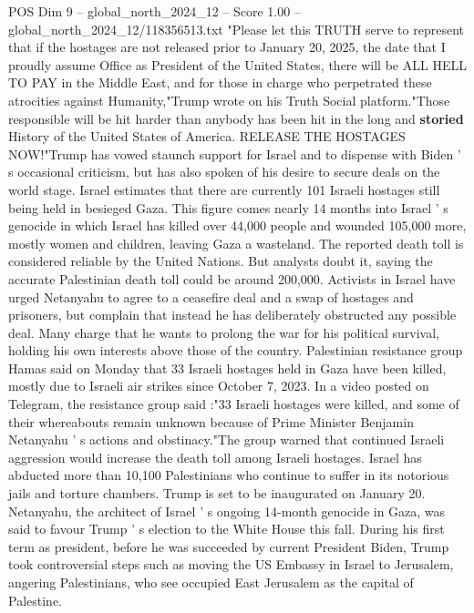 \begin{textsample}{POS Dim 9 – global\_north\_2024\_12 – Score 1.00 – global\_north\_2024\_12/118356513.txt}  \label{ex:f9_pos_336}
"Please let this TRUTH serve to represent that if the hostages are not released prior to January 20, 2025, the date that I proudly assume Office as President of the United States, there will be ALL HELL TO PAY in the Middle East, and for those in charge who perpetrated these atrocities against Humanity,"Trump wrote on his Truth Social platform."Those responsible will be hit harder than anybody has been hit in the long and \textbf{storied} History of the United States of America.
RELEASE THE HOSTAGES NOW!"Trump has vowed staunch support for Israel and to dispense with Biden ' s occasional criticism, but has also spoken of his desire to secure deals on the world stage.
Israel estimates that there are currently 101 Israeli hostages still being held in besieged Gaza.
This figure comes nearly 14 months into Israel ' s genocide in which Israel has killed over 44,000 people and wounded 105,000 more, mostly women and children, leaving Gaza a wasteland.
The reported death toll is considered reliable by the United Nations.
But analysts doubt it, saying the accurate Palestinian death toll could be around 200,000.
Activists in Israel have urged Netanyahu to agree to a ceasefire deal and a swap of hostages and prisoners, but complain that instead he has deliberately obstructed any possible deal.
Many charge that he wants to prolong the war for his political survival, holding his own interests above those of the country.
Palestinian resistance group Hamas said on Monday that 33 Israeli hostages held in Gaza have been killed, mostly due to Israeli air strikes since October 7, 2023.
In a video posted on Telegram, the resistance group said :"33 Israeli hostages were killed, and some of their whereabouts remain unknown because of Prime Minister Benjamin Netanyahu ' s actions and obstinacy."The group warned that continued Israeli aggression would increase the death toll among Israeli hostages.
Israel has abducted more than 10,100 Palestinians who continue to suffer in its notorious jails and torture chambers.
Trump is set to be inaugurated on January 20.
Netanyahu, the architect of Israel ' s ongoing 14-month genocide in Gaza, was said to favour Trump ' s election to the White House this fall.
During his first term as president, before he was succeeded by current President Biden, Trump took controversial steps such as moving the US Embassy in Israel to Jerusalem, angering Palestinians, who see occupied East Jerusalem as the capital of Palestine.

\end{textsample}
